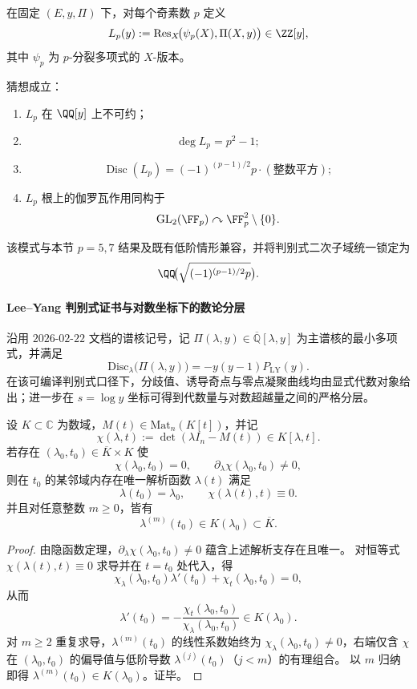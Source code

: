 \begin{conjecture}\label{conj:xi-leyang-torsion-image-uniform-pattern-all-odd-primes}
在固定 \((E,y,\Pi)\) 下，对每个奇素数 \(p\) 定义
\[
L_p(y):=\operatorname{Res}_X\!\bigl(\psi_p(X),\Pi(X,y)\bigr)\in\ZZ[y],
\]
其中 \(\psi_p\) 为 \(p\)-分裂多项式的 \(X\)-版本。

猜想成立：
\begin{enumerate}
  \item \(L_p\) 在 \(\QQ[y]\) 上不可约；
  \item
  \[
  \deg L_p=p^2-1;
  \]
  \item
  \[
  \operatorname{Disc}(L_p)=(-1)^{(p-1)/2}p\cdot(\text{整数平方});
  \]
  \item \(L_p\) 根上的伽罗瓦作用同构于
  \[
  \mathrm{GL}_2(\FF_p)\curvearrowright \FF_p^2\setminus\{0\}.
  \]
\end{enumerate}
该模式与本节 \(p=5,7\) 结果及既有低阶情形兼容，并将判别式二次子域统一锁定为
\[
\QQ\!\bigl(\sqrt{(-1)^{(p-1)/2}p}\bigr).
\]
\end{conjecture}

\paragraph{Lee--Yang 判别式证书与对数坐标下的数论分层}
沿用 \(2026\)-\(02\)-\(22\) 文档的谱核记号，记 \(\Pi(\lambda,y)\in\overline{\mathbb Q}[\lambda,y]\) 为主谱核的最小多项式，并满足
\[
\mathrm{Disc}_{\lambda}\bigl(\Pi(\lambda,y)\bigr)=-y(y-1)P_{\mathrm{LY}}(y).
\]
在该可编译判别式口径下，分歧值、诱导奇点与零点凝聚曲线均由显式代数对象给出；进一步在 \(s=\log y\) 坐标可得到代数量与对数超越量之间的严格分层。

\begin{theorem}[简单特征值解析分支的代数喷射封闭性]\label{thm:xi-leyang-simple-root-algebraic-jet-closure}
设 \(K\subset\mathbb C\) 为数域，\(M(t)\in\mathrm{Mat}_{n}(K[t])\)，并记
\[
\chi(\lambda,t):=\det(\lambda I_n-M(t))\in K[\lambda,t].
\]
若存在 \((\lambda_0,t_0)\in\overline K\times K\) 使
\[
\chi(\lambda_0,t_0)=0,\qquad
\partial_{\lambda}\chi(\lambda_0,t_0)\neq 0,
\]
则在 \(t_0\) 的某邻域内存在唯一解析函数 \(\lambda(t)\) 满足
\[
\lambda(t_0)=\lambda_0,\qquad
\chi(\lambda(t),t)\equiv 0.
\]
并且对任意整数 \(m\ge 0\)，皆有
\[
\lambda^{(m)}(t_0)\in K(\lambda_0)\subset\overline K.
\]
\end{theorem}
\begin{proof}
由隐函数定理，\(\partial_{\lambda}\chi(\lambda_0,t_0)\neq0\) 蕴含上述解析支存在且唯一。
对恒等式 \(\chi(\lambda(t),t)\equiv0\) 求导并在 \(t=t_0\) 处代入，得
\[
\chi_{\lambda}(\lambda_0,t_0)\lambda'(t_0)+\chi_t(\lambda_0,t_0)=0,
\]
从而
\[
\lambda'(t_0)
=-\frac{\chi_t(\lambda_0,t_0)}{\chi_{\lambda}(\lambda_0,t_0)}
\in K(\lambda_0).
\]
对 \(m\ge2\) 重复求导，\(\lambda^{(m)}(t_0)\) 的线性系数始终为 \(\chi_{\lambda}(\lambda_0,t_0)\neq0\)，右端仅含 \(\chi\) 在 \((\lambda_0,t_0)\) 的偏导值与低阶导数 \(\lambda^{(j)}(t_0)\)（\(j<m\)）的有理组合。
以 \(m\) 归纳即得 \(\lambda^{(m)}(t_0)\in K(\lambda_0)\)。证毕。
\end{proof}

